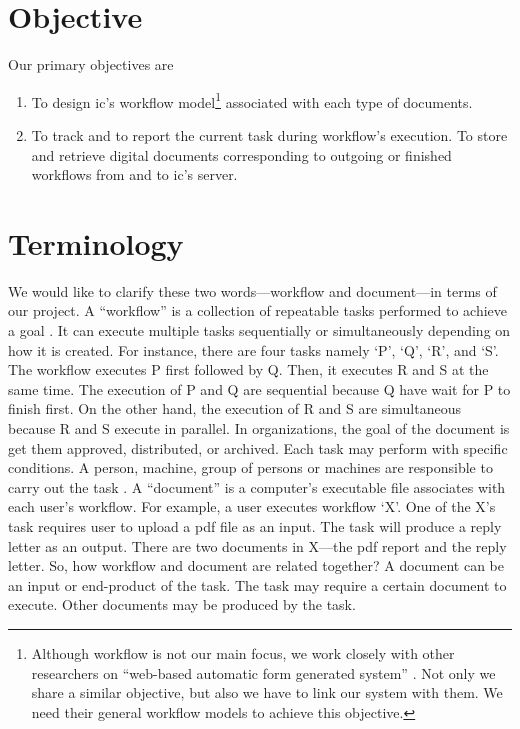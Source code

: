 \section{Objective}
\label{sec:objective}
Our primary objectives are
\begin{enumerate}
\item To design \gls{ic}'s workflow model\footnote{
	Although workflow is not our main focus, we work closely with other researchers on \enquote{web-based automatic form generated system} \cite{web-based-form}.
	Not only we share a similar objective, but also we have to link our system with them.
	We need their general workflow models to achieve this objective.
} associated with each type of documents.
\item To track and to report the current task during workflow's execution. To store and retrieve digital documents corresponding to outgoing or finished workflows from and to \gls{ic}'s server.
\end{enumerate}

\section{Terminology}
\label{sec:terminology}
We would like to clarify these two words---workflow and document---in terms of our project. %
A \enquote{workflow} is a collection of repeatable tasks performed to achieve a goal \cite{Jablonski:1996:WMM}.
It can execute multiple tasks sequentially or simultaneously depending on how it is created.
For instance, there are four tasks namely \enquote*{P}, \enquote*{Q}, \enquote*{R}, and \enquote*{S}.
The workflow executes P first followed by Q.
Then, it executes R and S at the same time.
The execution of P and Q are sequential because Q have wait for P to finish first.
On the other hand, the execution of R and S are simultaneous because R and S execute in parallel.
In organizations, the goal of the document is get them approved, distributed, or archived.
Each task may perform with specific conditions.
A person, machine, group of persons or machines are responsible to carry out the task \cite{wfMangement}. 
A \enquote{document} is a computer's executable file associates with each user's workflow.
For example, a user executes workflow \enquote*{X}.
One of the X's task requires user to upload a \gls{pdf} file as an input.
The task will produce a reply letter as an output.
There are two documents in X---the \gls{pdf} report and the reply letter.
So, how workflow and document are related together?
A document can be an input or end-product of the task.
The task may require a certain document to execute.
Other documents may be produced by the task.


